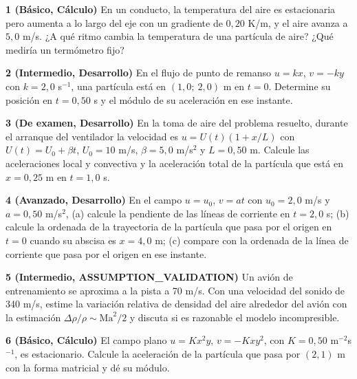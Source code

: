 \documentclass[10pt,openany]{book}
\begin{document}
\begin{tcolorbox}[title={Ejercicios propuestos}, studiumworked, breakable]

\noindent\textbf{1 (Básico, Cálculo)}
En un conducto, la temperatura del aire es estacionaria pero aumenta a lo largo del eje con un gradiente de \(0{,}20\) K/m, y el aire avanza a \(5{,}0\) m/s. ¿A qué ritmo cambia la temperatura de una partícula de aire? ¿Qué mediría un termómetro fijo?

\noindent\textbf{2 (Intermedio, Desarrollo)}
En el flujo de punto de remanso \(u = kx\), \(v = -ky\) con \(k = 2{,}0\) s\(^{-1}\), una partícula está en \((1{,}0;\ 2{,}0)\) m en \(t = 0\). Determine su posición en \(t = 0{,}50\) s y el módulo de su aceleración en ese instante.

\noindent\textbf{3 (De examen, Desarrollo)}
En la toma de aire del problema resuelto, durante el arranque del ventilador la velocidad es \(u = U(t)(1 + x/L)\) con \(U(t) = U_0 + \beta t\), \(U_0 = 10\) m/s, \(\beta = 5{,}0\) m/s\(^2\) y \(L = 0{,}50\) m. Calcule las aceleraciones local y convectiva y la aceleración total de la partícula que está en \(x = 0{,}25\) m en \(t = 1{,}0\) s.

\noindent\textbf{4 (Avanzado, Desarrollo)}
En el campo \(u = u_0\), \(v = at\) con \(u_0 = 2{,}0\) m/s y \(a = 0{,}50\) m/s\(^2\), (a) calcule la pendiente de las líneas de corriente en \(t = 2{,}0\) s; (b) calcule la ordenada de la trayectoria de la partícula que pasa por el origen en \(t = 0\) cuando su abscisa es \(x = 4{,}0\) m; (c) compare con la ordenada de la línea de corriente que pasa por el origen en ese instante.

\noindent\textbf{5 (Intermedio, ASSUMPTION\_VALIDATION)}
Un avión de entrenamiento se aproxima a la pista a 70 m/s. Con una velocidad del sonido de 340 m/s, estime la variación relativa de densidad del aire alrededor del avión con la estimación \(\Delta\rho/\rho \sim \mathrm{Ma}^{2}/2\) y discuta si es razonable el modelo incompresible.

\noindent\textbf{6 (Básico, Cálculo)}
El campo plano \(u = K x^{2} y\), \(v = -K x y^{2}\), con \(K = 0{,}50\) m\(^{-2}\)s\(^{-1}\), es estacionario. Calcule la aceleración de la partícula que pasa por \((2, 1)\) m con la forma matricial y dé su módulo.
\end{tcolorbox}
\end{document}
